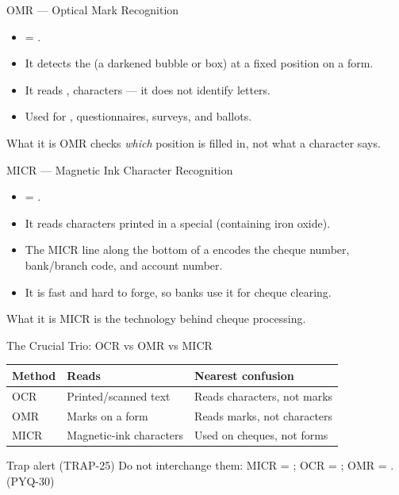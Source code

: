 \documentclass[aspectratio=169]{beamer}
\begin{document}
\begin{frame}{OMR --- Optical Mark Recognition}
  \begin{itemize}
    \item {} = .
    \item It detects the  (a darkened
      bubble or box) at a fixed position on a form.
    \item It reads ,  characters --- it does not identify
      letters.
    \item Used for , questionnaires, surveys, and
      ballots.
  \end{itemize}
  \begin{block}{What it is}
    OMR checks \emph{which} position is filled in, not what a character
    says.
  \end{block}
\end{frame}

\begin{frame}{MICR --- Magnetic Ink Character Recognition}
  \begin{itemize}
    \item {} = .
    \item It reads characters printed in a special 
      (containing iron oxide).
    \item The MICR line along the bottom of a  encodes the
      cheque number, bank/branch code, and account number.
    \item It is fast and hard to forge, so banks use it for cheque clearing.
  \end{itemize}
  \begin{block}{What it is}
    MICR is the  technology behind cheque processing.
  \end{block}
\end{frame}

\begin{frame}{The Crucial Trio: OCR vs OMR vs MICR}
  \begin{center}
    \begin{tabular}{p{}p{}p{}}
      \toprule
      \textbf{Method} & \textbf{Reads} & \textbf{Nearest confusion} \\
      \midrule
      OCR & Printed/scanned text & Reads characters, not marks \\
      OMR & Marks on a form & Reads marks, not characters \\
      MICR & Magnetic-ink characters & Used on cheques, not forms \\
      \bottomrule
    \end{tabular}
  \end{center}
  \vspace{0.25cm}
  \begin{alertblock}{Trap alert (TRAP-25)}
    Do not interchange them: MICR = ; OCR = ; OMR = . (PYQ-30)
  \end{alertblock}
\end{frame}
\end{document}
